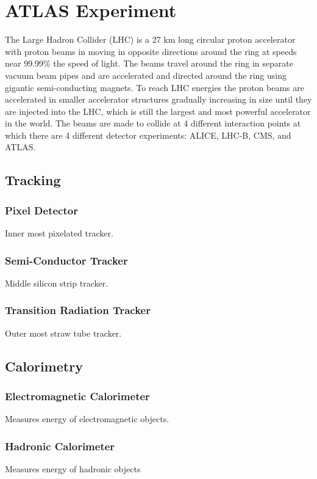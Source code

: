 \documentclass[11pt, oneside]{article}   	%
\begin{document}
\clearpage
\section{ATLAS Experiment}
\label{sec:detector}
The Large Hadron Collider (LHC) is a 27 km long circular proton accelerator with proton beams in moving in opposite directions around the ring at speeds near 99.99\% the speed of light.  The beams travel around the ring in separate vacuum beam pipes and are accelerated and directed around the ring using gigantic semi-conducting magnets.  To reach LHC energies the proton beams are accelerated in smaller accelerator structures gradually increasing in size until they are injected into the LHC, which is still the largest and most powerful accelerator in the world.  The beams are made to collide at 4 different interaction points at which there are 4 different detector experiments: ALICE, LHC-B, CMS, and ATLAS.  

\subsection{Tracking}
\subsubsection{Pixel Detector}
Inner most pixelated tracker.
\subsubsection{Semi-Conductor Tracker}
Middle silicon strip tracker.
\subsubsection{Transition Radiation Tracker}
Outer most straw tube tracker.

\subsection{Calorimetry}
\subsubsection{Electromagnetic Calorimeter}
Measures energy of electromagnetic objects.
\subsubsection{Hadronic Calorimeter}
Measures energy of hadronic objects
\end{document}
